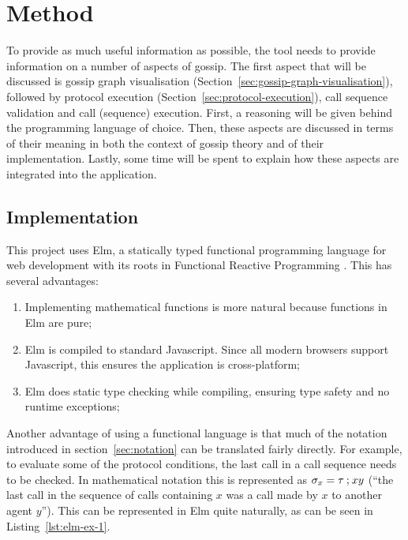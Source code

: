 
\section{Method}
\label{sec:method}

To provide as much useful information as possible, the tool needs to provide information on a number of aspects of gossip.
The first aspect that will be discussed is gossip graph visualisation (Section~\ref{sec:gossip-graph-visualisation}), followed by protocol execution (Section~\ref{sec:protocol-execution}), call sequence validation and call (sequence) execution.
First, a reasoning will be given behind the programming language of choice.
Then, these aspects are discussed in terms of their meaning in both the context of gossip theory and of their implementation.
Lastly, some time will be spent to explain how these aspects are integrated into the application.

\subsection{Implementation}

This project uses Elm, a statically typed functional programming language for web development with its roots in Functional Reactive Programming \parencite{czaplicki_asynchronous_2013}.
This has several advantages:

\begin{enumerate}
    \item Implementing mathematical functions is more natural because functions in Elm are pure;
    \item Elm is compiled to standard Javascript. Since all modern browsers support Javascript, this ensures the application is cross-platform;
    \item Elm does static type checking while compiling, ensuring type safety and no runtime exceptions;
\end{enumerate}

Another advantage of using a functional language is that much of the notation introduced in section~\ref{sec:notation} can be translated fairly directly.
For example, to evaluate some of the protocol conditions, the last call in a call sequence needs to be checked.
In mathematical notation this is represented as \(\sigma_x = \tau \mathbin{;} xy\) 
(``the last call in the sequence of calls containing \(x\) was a call made by \(x\) to another agent \(y\)'').
This can be represented in Elm quite naturally, as can be seen in Listing~\ref{lst:elm-ex-1}.

